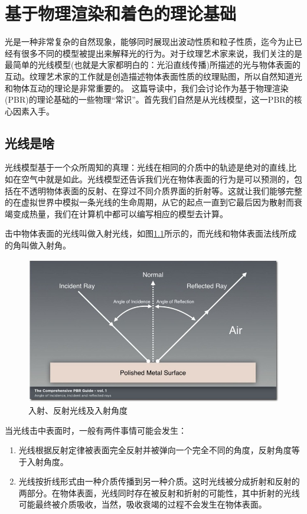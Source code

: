 \chapter{基于物理渲染和着色的理论基础}

光是一种非常复杂的自然现象，能够同时展现出波动性质和粒子性质，迄今为止已经有很多不同的模型被提出来解释光的行为。对于纹理艺术家来说，我们关注的是最简单的光线模型(也就是大家都明白的：光沿直线传播)所描述的光与物体表面的互动。纹理艺术家的工作就是创造描述物体表面性质的纹理贴图，所以自然知道光和物体互动的理论是非常重要的。
这篇导读中，我们会讨论作为基于物理渲染(PBR)的理论基础的一些物理“常识”。首先我们自然是从光线模型，这一PBR的核心因素入手。

\section{光线是啥}

光线模型基于一个众所周知的真理：光线在相同的介质中的轨迹是绝对的直线,比如在空气中就是如此。光线模型还告诉我们光在物体表面的行为是可以预测的，包括在不透明物体表面的反射、在穿过不同介质界面的折射等。这就让我们能够完整的在虚拟世界中模拟一条光线的生命周期，从它的起点一直到它最后因为散射而衰竭变成热量，我们在计算机中都可以编写相应的模型去计算。

击中物体表面的光线叫做入射光线，如图\ref{fig:chap1_1}所示的，而光线和物体表面法线所成的角叫做入射角。

\begin{figure}[ht]
    \centering
	\includegraphics[width=\textwidth]{images/chap1_1.jpg}
	\caption{入射、反射光线及入射角度}
    \label{fig:chap1_1}
\end{figure}

当光线击中表面时，一般有两件事情可能会发生：

\begin{enumerate}
\item 光线根据反射定律被表面完全反射并被弹向一个完全不同的角度，反射角度等于入射角度。
\item 光线按折线形式由一种介质传播到另一种介质。这时光线被分成折射和反射的两部分。在物体表面，光线同时存在被反射和折射的可能性，其中折射的光线可能最终被介质吸收，当然，吸收衰竭的过程不会发生在物体表面。
\end{enumerate}

